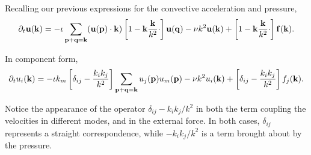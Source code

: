 Recalling our previous expressions for the convective acceleration and pressure,
\begin{equation*}
	\partial_t \mathbf{u} (\mathbf{k})  =
	- \iota  
	\sum_{ \mathbf{p} + \mathbf{q} = \mathbf{k}}
	(\mathbf{u}(\mathbf{p} ) \cdot \mathbf{k} )
	\left[ 
	1 - \mathbf{k} \frac{\mathbf{k} }{k^2} \cdot 
	\right]
	\mathbf{u}(\mathbf{q} )
	- \nu k^2 \mathbf{u}(\mathbf{k}) +
	\left[ 
	1 - \mathbf{k} \frac{\mathbf{k} }{k^2} \cdot 
	\right]
	\mathbf{f}(\mathbf{k}) .
\end{equation*}

In component form,
\begin{equation*}
	\partial_t u_i (\mathbf{k})  =
	- \iota  k_m
	\left[ 
	\delta_{ij} - \frac{k_i k_j  }{k^2}
	\right]
	\sum_{ \mathbf{p} + \mathbf{q} = \mathbf{k}}
	u_j(\mathbf{p} ) u_m(\mathbf{p} ) 
	- \nu k^2 u_i(\mathbf{k}) +
	\left[ 
	\delta_{ij} - \frac{k_i k_j }{k^2} 
	\right]
	f_j(\mathbf{k}) .
\end{equation*}

Notice the appearance of the operator \(  \delta_{ij} - k_i k_j  / k^2 \) in both the
term coupling the velocities in different modes, and in the external force. In both cases,
\(  \delta_{ij} \) represents a straight correspondence, while \(  - k_i k_j  / k^2 \)
is a term brought about by the pressure.

